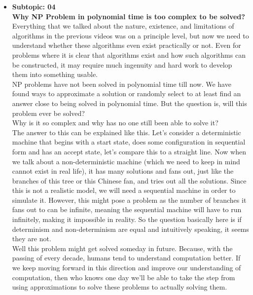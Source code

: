 \documentclass[a4page]{exam}
\newcommand\tab[1][1cm]{\hspace*{#1}}
\begin{document}
\begin{itemize}
    
    \item \textbf{Subtopic: 04\\ Why NP Problem in polynomial time is too complex to be solved?}\\ 
    \tab Everything that we talked about the nature, existence, and limitations of algorithms in the previous videos was on a principle level, but now we need to understand whether these algorithms even exist practically or not. Even for problems where it is clear that algorithms exist and how such algorithms can be constructed, it may require much ingenuity and hard work to develop them into something usable. \\ \tab
NP problems have not been solved in polynomial time till now. We have found ways to approximate a solution or randomly select to at least find an answer close to being solved in polynomial time. But the question is, will this problem ever be solved?\\ \tab
Why is it so complex and why has no one still been able to solve it? \\ \tab
The answer to this can be explained like this. Let’s consider a deterministic machine that begins with a start state, does some configuration in sequential form and has an accept state, let's compare this to a straight line. Now when we talk about a non-deterministic machine (which we need to keep in mind cannot exist in real life), it has many solutions and fans out, just like the branches of this tree or this Chinese fan, and tries out all the solutions. Since this is not a realistic model, we will need a sequential machine in order to simulate it. However, this might pose a problem as the number of branches it fans out to can be infinite, meaning the sequential machine will have to run infinitely, making it impossible in reality. So the question basically here is if determinism and non-determinism are equal and intuitively speaking, it seems they are not. \\ \tab
Well this problem might get solved someday in future. Because, with the passing of every decade, humans tend to understand computation better. If we keep moving forward in this direction and improve our understanding of computation, then who knows one day we'll be able to take the step from using approximations to solve these problems to actually solving them.

\end{itemize}
\end{document}
